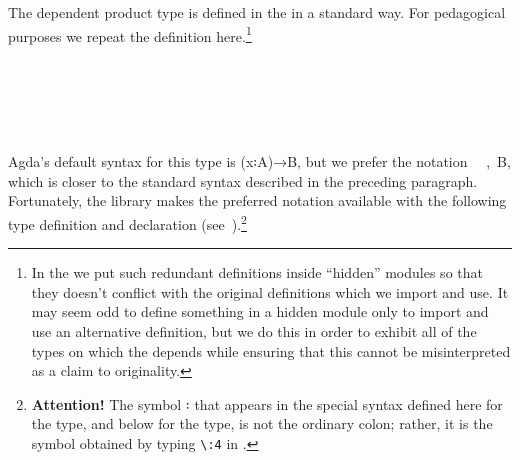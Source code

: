 The dependent product type is defined in the \typetopology in a standard way. For pedagogical purposes we repeat the definition here.\footnote{In the \ualib we put such redundant definitions inside ``hidden'' modules so that they doesn't conflict with the original definitions which we import and use. It may seem odd to define something in a hidden module only to import and use an alternative definition, but we do this in order to exhibit all of the types on which the \ualib depends while ensuring that this cannot be misinterpreted as a claim to originality.}
\ccpad
\begin{code}%
\>[1]\AgdaSpace{}%
\AgdaSpace{}%
\AgdaSymbol{\{}\AgdaSpace{}%
\AgdaSymbol{\}}\AgdaSpace{}%
\AgdaSymbol{\{}\AgdaSpace{}%
\AgdaSymbol{:}\AgdaSpace{}%
\AgdaSpace{}%
\AgdaSpace{}%
\AgdaSymbol{\}}\AgdaSpace{}%
\AgdaSymbol{(}\AgdaSpace{}%
\AgdaSymbol{:}\AgdaSpace{}%
\AgdaSpace{}%
\AgdaSpace{}%
\AgdaSpace{}%
\AgdaSpace{}%
\AgdaSymbol{)}\AgdaSpace{}%
\AgdaSymbol{:}\AgdaSpace{}%
\AgdaSpace{}%
\AgdaSpace{}%
\AgdaSpace{}%
%
\>[53]\<%
\\
\>[1][@{}l@{\AgdaIndent{0}}]%
\>[2]\AgdaSpace{}%
\AgdaOperator{\AgdaInductiveConstructor{\AgdaUnderscore{},\AgdaUnderscore{}}}\<%
\\
%
\>[2]\<%
\\
\>[2][@{}l@{\AgdaIndent{0}}]%
\>[3]\AgdaSpace{}%
\AgdaSymbol{:}\AgdaSpace{}%
\<%
\\
%
\>[3]\AgdaSpace{}%
\AgdaSymbol{:}\AgdaSpace{}%
\AgdaSpace{}%
\<%
\end{code}
\ccpad
Agda's default syntax for this type is (\ab x꞉\ab A)\as →\ab B, but we prefer the notation ~~,~\ab B, which is closer to the standard syntax described in the preceding paragraph. Fortunately, the \typetopology library makes the preferred notation available with the following type definition and  declaration (see~\cite[Σ types]{MHE}).\footnote{\label{fncolon}\textbf{Attention!} The symbol \af ꞉ that appears in the special syntax defined here for the  type, and below for the  type, is not the ordinary colon; rather, it is the symbol obtained by typing \texttt{\textbackslash{}:4} in \agdatwomode.} 
